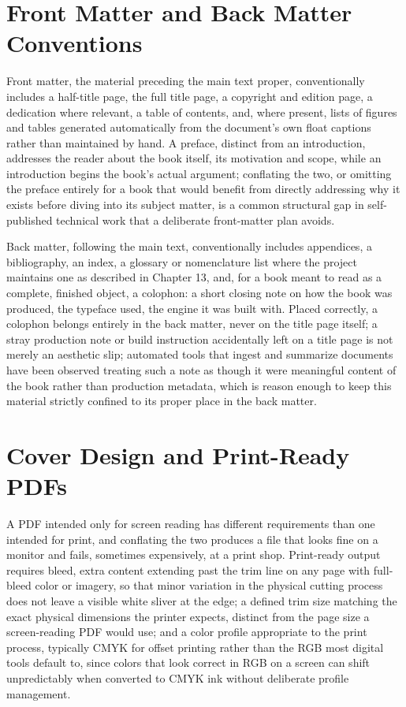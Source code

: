 \hypertarget{front-matter-and-back-matter-conventions}{%
\section{Front Matter and Back Matter Conventions}\label{front-matter-and-back-matter-conventions}}

Front matter, the material preceding the main text proper, conventionally includes a half-title page, the full title page, a copyright and edition page, a dedication where relevant, a table of contents, and, where present, lists of figures and tables generated automatically from the document's own float captions rather than maintained by hand. A preface, distinct from an introduction, addresses the reader about the book itself, its motivation and scope, while an introduction begins the book's actual argument; conflating the two, or omitting the preface entirely for a book that would benefit from directly addressing why it exists before diving into its subject matter, is a common structural gap in self-published technical work that a deliberate front-matter plan avoids.

Back matter, following the main text, conventionally includes appendices, a bibliography, an index, a glossary or nomenclature list where the project maintains one as described in Chapter 13, and, for a book meant to read as a complete, finished object, a colophon: a short closing note on how the book was produced, the typeface used, the engine it was built with. Placed correctly, a colophon belongs entirely in the back matter, never on the title page itself; a stray production note or build instruction accidentally left on a title page is not merely an aesthetic slip; automated tools that ingest and summarize documents have been observed treating such a note as though it were meaningful content of the book rather than production metadata, which is reason enough to keep this material strictly confined to its proper place in the back matter.

\hypertarget{cover-design-and-print-ready-pdfs}{%
\section{Cover Design and Print-Ready PDFs}\label{cover-design-and-print-ready-pdfs}}

A PDF intended only for screen reading has different requirements than one intended for print, and conflating the two produces a file that looks fine on a monitor and fails, sometimes expensively, at a print shop. Print-ready output requires bleed, extra content extending past the trim line on any page with full-bleed color or imagery, so that minor variation in the physical cutting process does not leave a visible white sliver at the edge; a defined trim size matching the exact physical dimensions the printer expects, distinct from the page size a screen-reading PDF would use; and a color profile appropriate to the print process, typically CMYK for offset printing rather than the RGB most digital tools default to, since colors that look correct in RGB on a screen can shift unpredictably when converted to CMYK ink without deliberate profile management.

